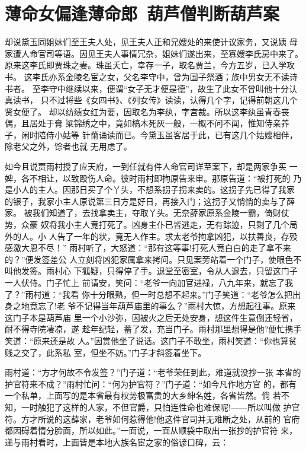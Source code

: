 \chapter{薄命女偏逢薄命郎~葫芦僧判断葫芦案}

却说黛玉同姐妹们至王夫人处，见王夫人正和兄嫂处的来使计议家务，又说姨
母家遭人命官司等语。因见王夫人事情冗杂，姐妹们遂出来，至寡嫂李氏房中来了。
原来这李氏即贾珠之妻。珠虽夭亡，幸存一子，取名贾兰，今方五岁，已入学攻书。
这李氏亦系金陵名宦之女，父名李守中，曾为国子祭酒；族中男女无不读诗书者。
至李守中继续以来，便谓“女子无才便是德”，故生了此女不曾叫他十分认真读书，
只不过将些《女四书》、《列女传》读读，认得几个字，记得前朝这几个贤女便了。
却以纺绩女红为要，因取名为李纨，字宫裁。所以这李纨虽青春丧偶，且居处于膏
粱锦绣之中，竟如槁木死灰一般，一概不问不闻，惟知侍亲养子，闲时陪侍小姑等
针黹诵读而已。今黛玉虽客居于此，已有这几个姑嫂相伴，除老父之外，馀者也就
无用虑了。

如今且说贾雨村授了应天府，一到任就有件人命官司详至案下，却是两家争买
一婢，各不相让，以致殴伤人命。彼时雨村即拘原告来审。那原告道：“被打死的
乃是小人的主人。因那日买了个丫头，不想系拐子拐来卖的。这拐子先已得了我家
的银子，我家小主人原说第三日方是好日，再接入门；这拐子又悄悄的卖与了薛家。
被我们知道了，去找拿卖主，夺取丫头。无奈薛家原系金陵一霸，倚财仗势，众豪
奴将我小主人竟打死了。凶身主仆已皆逃走，无有踪迹，只剩了几个局外的人。小
人告了一年的状，竟无人作主。求太老爷拘拿凶犯，以扶善良，存殁感激大恩不尽！”
雨村听了，大怒道：“那有这等事!打死人竟白白的走了拿不来的？”便发签差公
人立刻将凶犯家属拿来拷问。只见案旁站着一个门子，使眼色不叫他发签。雨村心
下狐疑，只得停了手。退堂至密室，令从人退去，只留这门子一人伏侍。门子忙上
前请安，笑问：“老爷一向加官进禄，八九年来，就忘了我了？”雨村道：“我看
你十分眼熟，但一时总想不起来。”门子笑道：“老爷怎么把出身之地竟忘了!老
爷不记得当年葫芦庙里的事么？”雨村大惊，方想起往事。原来这门子本是葫芦庙
里一个小沙弥，因被火之后无处安身，想这件生意倒还轻省，耐不得寺院凄凉，遂
趁年纪轻，蓄了发，充当门子。雨村那里想得是他?便忙携手笑道：“原来还是故
人。”因赏他坐了说话。这门子不敢坐，雨村笑道：“你也算贫贱之交了，此系私
室，但坐不妨。”门子才斜签着坐下。

雨村道：“方才何故不令发签？”门子道：“老爷荣任到此，难道就没抄一张
本省的护官符来不成？”雨村忙问：“何为护官符？”门子道：“如今凡作地方官
的，都有一个私单，上面写的是本省最有权势极富贵的大乡绅名姓，各省皆然。倘
若不知，一时触犯了这样的人家，不但官爵，只怕连性命也难保呢!——所以叫做
护官符。方才所说的这薛家，老爷如何惹得他!他这件官司并无难断之处，从前的
官府都因碍着情分脸面，所以如此。”一面说，一面从顺袋中取出一张抄的护官符
来，递与雨村看时，上面皆是本地大族名宦之家的俗谚口碑，云：

